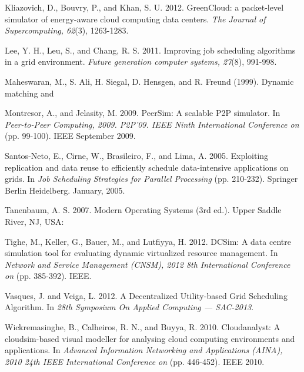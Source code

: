 \documentclass[times, 10pt,twocolumn]{article}
\begin{document}
\begin{thebibliography}{1}
 Kliazovich, D., Bouvry, P., and Khan, S. U. 2012. GreenCloud: a packet-level simulator of energy-aware cloud computing data centers. {\em The Journal of Supercomputing, 62}(3), 1263-1283.

 Lee, Y. H., Leu, S., and Chang, R. S. 2011. Improving job scheduling algorithms in a grid environment. {\em Future generation computer systems, 27}(8), 991-998.

Maheswaran, M., S. Ali, H. Siegal, D. Hensgen, and R. Freund (1999). Dynamic matching and

 Montresor, A., and Jelasity, M. 2009. PeerSim: A scalable P2P simulator. In {\em Peer-to-Peer Computing, 2009. P2P'09. IEEE Ninth International Conference on} (pp. 99-100). IEEE September 2009.

 Santos-Neto, E., Cirne, W., Brasileiro, F., and Lima, A. 2005. Exploiting replication and data reuse to efficiently schedule data-intensive applications on grids. In {\em Job Scheduling Strategies for Parallel Processing} (pp. 210-232). Springer Berlin Heidelberg. January, 2005.

 Tanenbaum, A. S. 2007. Modern Operating Systems (3rd ed.). Upper Saddle River, NJ, USA:

 Tighe, M., Keller, G., Bauer, M., and Lutfiyya, H. 2012. DCSim: A data centre simulation tool for evaluating dynamic virtualized resource management. In {\em Network and Service Management (CNSM), 2012 8th International Conference on} (pp. 385-392). IEEE.

 Vasques, J. and Veiga, L. 2012. A Decentralized Utility-based Grid Scheduling Algorithm. In {\em 28th Symposium On Applied Computing --- SAC-2013}.

 Wickremasinghe, B., Calheiros, R. N., and Buyya, R. 2010. Cloudanalyst: A cloudsim-based visual modeller for analysing cloud computing environments and applications. In {\em Advanced Information Networking and Applications (AINA), 2010 24th IEEE International Conference on} (pp. 446-452). IEEE 2010.


\end{thebibliography}
\end{document}
